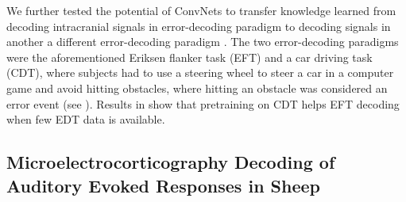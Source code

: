     We further tested the potential of ConvNets to transfer knowledge
learned from decoding intracranial signals in error-decoding paradigm to
decoding signals in another a different error-decoding paradigm
\cite{behncke2018cross}. The two error-decoding paradigms were
the aforementioned Eriksen flanker task (EFT) and a car driving task
(CDT), where subjects had to use a steering wheel to steer a car in a
computer game and avoid hitting obstacles, where hitting an obstacle was
considered an error event (see
). Results in
 show that
pretraining on CDT helps EFT decoding when few EDT data is available.

\subsection{Microelectrocorticography Decoding of Auditory Evoked
Responses in
Sheep}\label{microelectrocorticography-decoding-of-auditory-evoked-responses-in-sheep}



